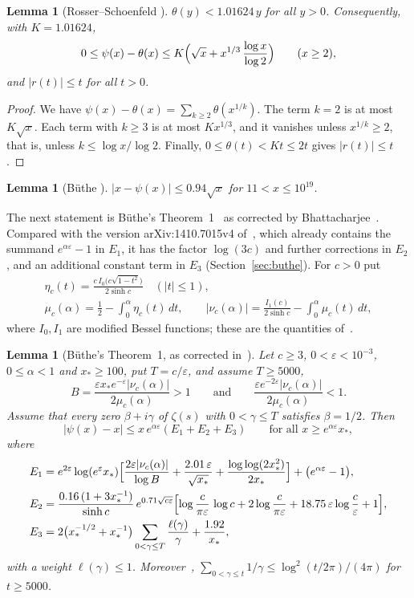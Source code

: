 \documentclass{amsart}
\newtheorem{lemma}[theorem]{Lemma}
\theoremstyle{definition}
\theoremstyle{remark}
\theoremstyle{plain}
\numberwithin{equation}{section}
\newcommand{\eps}{\varepsilon}
\begin{document}
\begin{lemma}[Rosser--Schoenfeld {\cite[Thm.~9]{RS62}}]\label{lem:RS}
$\theta(y)<1.01624\,y$ for all $y>0$. Consequently, with $K=1.01624$,
\[
0\le\psi(x)-\theta(x)\le K\Bigl(\sqrt x+x^{1/3}\,\frac{\log x}{\log2}\Bigr)\qquad(x\ge2),
\]
and $|r(t)|\le t$ for all $t>0$.
\end{lemma}

\begin{proof}
We have $\psi(x)-\theta(x)=\sum_{k\ge2}\theta(x^{1/k})$. The term $k=2$ is at most $K\sqrt x$. Each term with $k\ge3$ is at most $Kx^{1/3}$, and it vanishes unless $x^{1/k}\ge2$, that is, unless $k\le\log x/\log2$. Finally, $0\le\theta(t)<Kt\le2t$ gives $|r(t)|\le t$.
\end{proof}

\begin{lemma}[B\"uthe {\cite[Thm.~2, (1.5)]{But18}}]\label{lem:Buthe18}
$|x-\psi(x)|\le0.94\sqrt x$ for $11<x\le10^{19}$.
\end{lemma}

The next statement is B\"uthe's Theorem~1~\cite{But16} as corrected by Bhattacharjee~\cite[Thm.~7]{Bha24}. Compared with the version arXiv:1410.7015v4 of~\cite{But16}, which already contains the summand $e^{\alpha\eps}-1$ in $E_1$, it has the factor $\log(3c)$ and further corrections in $E_2$, and an additional constant term in $E_3$ (Section~\ref{sec:buthe}). For $c>0$ put
\begin{gather*}
\eta_c(t)=\frac{c\,I_0\bigl(c\sqrt{1-t^2}\bigr)}{2\sinh c}\quad(|t|\le1),\\
\mu_c(\alpha)=\frac12-\int_0^\alpha\eta_c(t)\,dt,\qquad
|\nu_c(\alpha)|=\frac{I_1(c)}{2\sinh c}-\int_0^\alpha\mu_c(t)\,dt,
\end{gather*}
where $I_0,I_1$ are modified Bessel functions; these are the quantities of~\cite[\S5]{But16}.

\begin{lemma}[B\"uthe's Theorem~1, as corrected in~{\cite[Thm.~7]{Bha24}}]\label{lem:Buthe16}
Let $c\ge3$, $0<\eps<10^{-3}$, $0\le\alpha<1$ and $x_*\ge100$, put $T=c/\eps$, and assume $T\ge5000$,
\[
B=\frac{\eps x_*e^{-\eps}|\nu_c(\alpha)|}{2\mu_c(\alpha)}>1\qquad\text{and}\qquad\frac{\eps e^{-2\eps}|\nu_c(\alpha)|}{2\mu_c(\alpha)}<1.
\]
Assume that every zero $\beta+i\gamma$ of $\zeta(s)$ with $0<\gamma\le T$ satisfies $\beta=1/2$. Then
\[
|\psi(x)-x|\le x\,e^{\alpha\eps}(E_1+E_2+E_3)\qquad\text{for all }x\ge e^{\alpha\eps}x_*,
\]
where
\begin{align*}
E_1&=e^{2\eps}\log(e^{\eps}x_*)\Bigl[\frac{2\eps|\nu_c(\alpha)|}{\log B}+\frac{2.01\,\eps}{\sqrt{x_*}}+\frac{\log\log(2x_*^2)}{2x_*}\Bigr]+\bigl(e^{\alpha\eps}-1\bigr),\\
E_2&=\frac{0.16\,(1+3x_*^{-1})}{\sinh c}\,e^{0.71\sqrt{c\eps}}\Bigl[\log\frac{c}{\pi\eps}\,\log c+2\log\frac{c}{\pi\eps}+18.75\,\eps\log\frac{c}{\eps}+1\Bigr],\\
E_3&=2\bigl(x_*^{-1/2}+x_*^{-1}\bigr)\sum_{0<\gamma\le T}\frac{\ell(\gamma)}{\gamma}+\frac{1.92}{x_*},
\end{align*}
with a weight $\ell(\gamma)\le1$. Moreover~\cite[Lemma~3]{But16}, $\sum_{0<\gamma\le t}1/\gamma\le\log^2(t/2\pi)/(4\pi)$ for $t\ge5000$.
\end{lemma}
\end{document}
